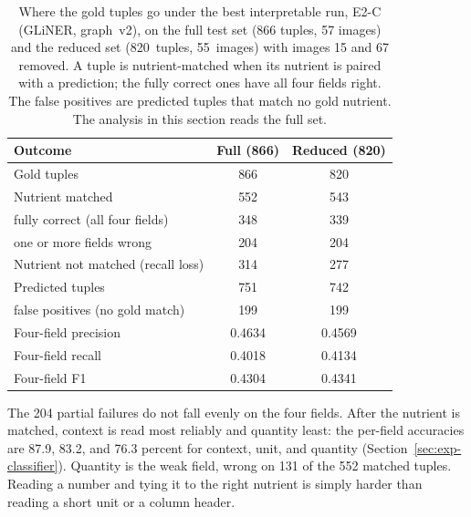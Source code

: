 \begin{table}[htbp]
  \centering
  \caption[Where the gold tuples go]{Where the gold tuples go under the best
    interpretable run, E2-C (GLiNER, graph~v2), on the full test set (866
    tuples, 57 images) and the reduced set (820~tuples, 55~images) with
    images 15 and 67 removed. A tuple is nutrient-matched when its nutrient
    is paired with a prediction; the fully correct ones have all four fields
    right. The false positives are predicted tuples that match no gold
    nutrient. The analysis in this section reads the full set.}
  \label{tab:funnel}
  \small
  \begin{tabular}{@{}lcc@{}}
    \toprule
    \textbf{Outcome} & \textbf{Full (866)} & \textbf{Reduced (820)} \\
    \midrule
    Gold tuples                            & 866 & 820 \\
    Nutrient matched                       & 552 & 543 \\
    \quad fully correct (all four fields)  & 348 & 339 \\
    \quad one or more fields wrong         & 204 & 204 \\
    Nutrient not matched (recall loss)     & 314 & 277 \\
    \addlinespace
    Predicted tuples                       & 751 & 742 \\
    \quad false positives (no gold match)  & 199 & 199 \\
    \midrule
    Four-field precision                   & 0.4634 & 0.4569 \\
    Four-field recall                      & 0.4018 & 0.4134 \\
    Four-field F1                          & 0.4304 & 0.4341 \\
    \bottomrule
  \end{tabular}
\end{table}




The 204 partial failures do not fall evenly on the four fields. After the
nutrient is matched, context is read most reliably and quantity least: the
per-field accuracies are 87.9, 83.2, and 76.3 percent for context, unit,
and quantity (Section~\ref{sec:exp-classifier}). Quantity is the weak field,
wrong on 131 of the 552 matched tuples. Reading a number and tying it to the
right nutrient is simply harder than reading a short unit or a column
header.

